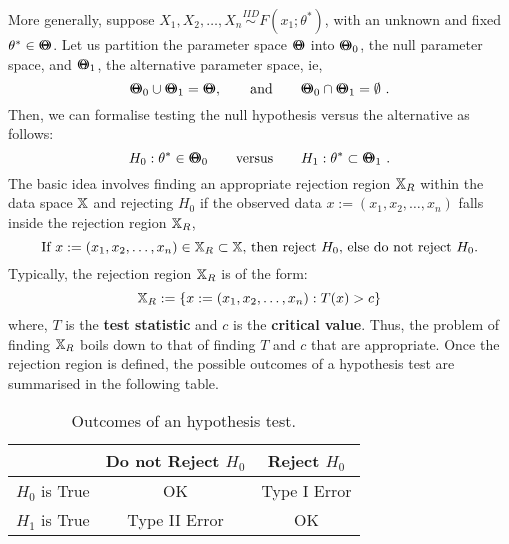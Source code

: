 
More generally, suppose $X_1,X_2,\ldots,X_n \overset{IID}{\sim} F(x_1;\theta^*)$, with an unknown and fixed $\theta^* \in {\Theta}\mspace{-11 mu}{\Theta}$.  Let us partition the parameter space ${\Theta}\mspace{-11 mu}{\Theta}$ into ${\Theta}\mspace{-11 mu}{\Theta}_0$, the null parameter space, and ${\Theta}\mspace{-11 mu}{\Theta}_1$, the alternative parameter space, ie,
$$\BB{\Theta}_0 \cup \BB{\Theta}_1 = \BB{\Theta}, \qquad \text{and} \qquad \BB{\Theta}_0 \cap \BB{\Theta}_1 = \emptyset \ .$$
Then, we can formalise testing the null hypothesis versus the alternative as follows:
\[
H_0 : \theta^* \in {\Theta}\mspace{-11 mu}{\Theta}_0 \qquad \text{versus} \qquad H_1 :  \theta^* \subset {\Theta}\mspace{-11 mu}{\Theta}_1 \ .
\]
The basic idea involves finding an appropriate rejection region $\mathbb{X}_R$ within the data space $\mathbb{X}$ and rejecting $H_0$ if the observed data $x:=(x_1,x_2,\ldots,x_n)$ falls inside the rejection region $\mathbb{X}_R$,
\[
\text{If $x:=(x_1,x_2,\ldots,x_n) \in \mathbb{X}_R \subset \mathbb{X}$, then reject $H_0$, else do not reject $H_0$.} 
\]
Typically, the rejection region $\mathbb{X}_R$ is of the form:
\[
\mathbb{X}_R := \{ x:=(x_1,x_2,\ldots,x_n)  : T(x) > c \}
\]
where, $T$ is the {\bf test statistic} and $c$ is the {\bf critical value}.  Thus, the problem of finding $\mathbb{X}_R$ boils down to that of finding $T$ and $c$ that are appropriate.  Once the rejection region is defined, the possible outcomes of a hypothesis test are summarised in the following table.
\begin{table}[htbp]
\begin{center}
\caption{Outcomes of an hypothesis test.}
\begin{tabular}{c|c|c}\hline
& Do not Reject $H_0$ & Reject $H_0$ \\ \hline
$H_0$ is True & OK & Type I Error \\ \hline
$H_1$ is True & Type II Error & OK \\ \hline
\end{tabular}
\end{center}
\end{table}

